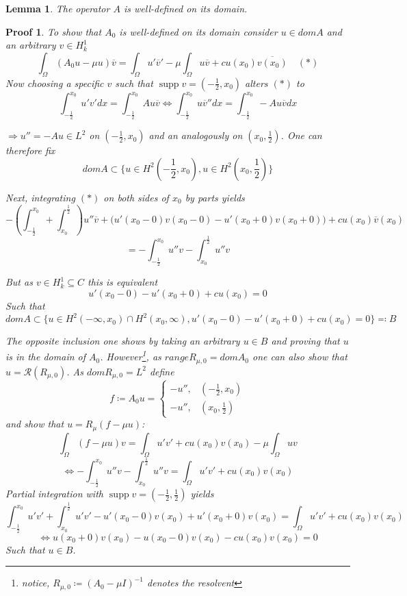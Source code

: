 \documentclass[14pt,a4paper]{scrartcl}
\newtheorem{Lemma}[Satz]{Lemma}
\newtheorem*{proof*}{Proof}
\numberwithin{equation}{section}
\def\supp{\operatorname{supp}}
\begin{document}
\begin{Lemma} 
	The operator $A$ is well-defined on its domain.
\end{Lemma}
\begin{proof*}
	To show that $A_{0}$ is well-defined on its domain consider $u \in dom A$ and an arbitrary $v \in H^{1}_{k}$ %
	\[  \int_{\Omega} \left( A_{0} u - \mu u \right) \overline{v} = \int_{\Omega} u' \overline{v}' - \mu \int_{\Omega} u \overline{v} + c u(x_{0}) \overline{v(x_{0})} \quad (*) \]	
	Now choosing a specific $v$ such that $\supp v = (-\frac{1}{2}, x_{0})$ alters $(*)$ to
	\[ \int_{-\frac{1}{2}}^{x_{0}} u' v' dx = \int_{-\frac{1}{2}}^{x_{0}} A u \overline{v} \iff \int_{-\frac{1}{2}}^{x_{0}} u \overline{v}'' dx = \int_{-\frac{1}{2}}^{x_{0}} - A u \overline{v} dx \]

	$\Rightarrow u'' = - A u \in L^{2}$ on $(-\frac{1}{2}, x_{0})$ and an analogously on $(x_{0}, \frac{1}{2})$. One can therefore fix
	\[ dom A \subset \{ u \in H^{2}(-\frac{1}{2}, x_{0}), u \in H^{2}(x_{0}, \frac{1}{2}) \} \]

	Next, integrating $(*)$ on both sides of $x_{0}$ by parts yields 
	\[ -\left( \int_{-\frac{1}{2}}^{x_{0}} + \int_{x_{0}}^{\frac{1}{2}}\right) u'' \overline{v} + \big( u'(x_{0}-0) v(x_{0} - 0) - u'(x_{0} + 0)v(x_{0}+0) \big) + c u(x_{0})\overline{v}(x_{0}) \]
	\[  = - \int_{-\frac{1}{2}}^{x_{0}} u'' v - \int_{x_{0}}^{\frac{1}{2}} u'' v \]

	But as $v \in H^{1}_{k} \subseteq C$ this is equivalent
	\[ u'(x_{0}-0) - u'(x_{0}+0) + c u(x_{0}) = 0 \]
	Such that
	\[ dom A \subset \{  u \in H^{2}(-\infty, x_{0}) \cap H^{2}(x_{0}, \infty), u'(x_{0} - 0) - u'(x_{0} + 0) + c u(x_{0}) = 0 \} \eqqcolon B \]	
	
	The opposite inclusion one shows by taking an arbitrary $u \in B$ and proving that $u$ is in the domain of $A_{0}$. However\footnote{notice, $R_{\mu, 0} \coloneqq (A_{0} - \mu I)^{-1}$ denotes the resolvent}, as $range R_{\mu, 0} = dom A_{0}$ one can also show that $u = \mathcal{R}(R_{\mu, 0})$. As $dom R_{\mu, 0} = L^{2}$ define 
	\[ f \coloneqq A_{0} u = \begin{cases}
								-u'', & (-\frac{1}{2}, x_{0}) \\ 
								-u'', & (x_{0}, \frac{1}{2})
							 \end{cases} \] 
	and show that $u = R_{\mu}(f - \mu u)$:
	\[ \int_{\Omega}(f-\mu u)v = \int_{\Omega} u' v' +c u(x_{0}) v(x_{0}) - \mu \int_{\Omega} u v \]
	\[ \iff - \int_{-\frac{1}{2}}^{x_{0}} u'' v - \int_{x_{0}}^{\frac{1}{2}} u'' v = \int_{\Omega} u' v' + c u(x_{0}) v(x_{0}) \]
	Partial integration with $\supp v = (-\frac{1}{2}, \frac{1}{2})$ yields
	\[ \int_{-\frac{1}{2}}^{x_{0}} u'v' + \int_{x_{0}}^{\frac{1}{2}} u'v' -u'(x_{0}-0) v(x_{0})  + u'(x_{0}+0) v(x_{0}) = \int_{\Omega} u' v' + c u(x_{0}) v(x_{0}) \]
	\[ \iff u(x_{0}+0)v(x_{0}) - u(x_{0}-0) v(x_{0}) - c u(x_{0})v(x_{0}) = 0 \]
	Such that $u \in B$.
\end{proof*}
\end{document}

